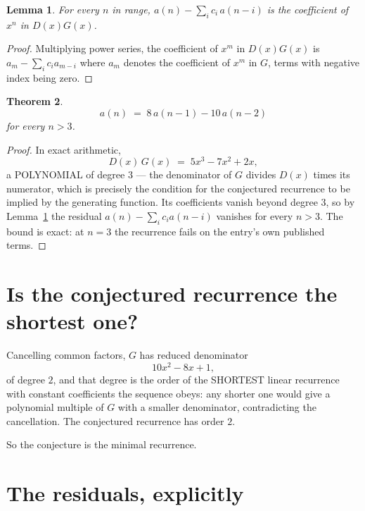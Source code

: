 \documentclass[11pt,a4paper]{article}
\theoremstyle{plain}
\newtheorem{theorem}{Theorem}
\newtheorem{lemma}[theorem]{Lemma}
\theoremstyle{definition}
\begin{document}
\begin{lemma}\label{lem:key}
For every $n$ in range, $a(n)-\sum_i c_i\,a(n-i)$ is the coefficient of $x^{n}$ in
$D(x)G(x)$.
\end{lemma}

\begin{proof}
Multiplying power series, the coefficient of $x^{m}$ in $D(x)G(x)$ is
$a_m-\sum_i c_i a_{m-i}$ where $a_m$ denotes the coefficient of $x^{m}$ in $G$, terms with
negative index being zero.
\end{proof}

\begin{theorem}
\[
a(n)\;=\;8\,a(n-1) - 10\,a(n-2)
\]
for every $n>3$.
\end{theorem}

\begin{proof}
In exact arithmetic,
\[
D(x)\,G(x)\;=\;5 x^{3} - 7 x^{2} + 2 x,
\]
a POLYNOMIAL of degree $3$ --- the denominator of $G$ divides $D(x)$ times its numerator,
which is precisely the condition for the conjectured recurrence to be implied by the
generating function. Its coefficients vanish beyond degree $3$, so by
Lemma~\ref{lem:key} the residual $a(n)-\sum_ic_ia(n-i)$ vanishes for every
$n>3$. The bound is exact: at $n=3$ the recurrence fails on the entry's own published terms.
\end{proof}

\section{Is the conjectured recurrence the shortest one?}

Cancelling common factors, $G$ has reduced denominator
\[
10 x^{2} - 8 x + 1,
\]
of degree $2$, and that degree is the order of the SHORTEST linear recurrence with
constant coefficients the sequence obeys: any shorter one would give a polynomial multiple of
$G$ with a smaller denominator, contradicting the cancellation. The conjectured recurrence has
order $2$.

So the conjecture is the minimal recurrence.

\section{The residuals, explicitly}
\end{document}
